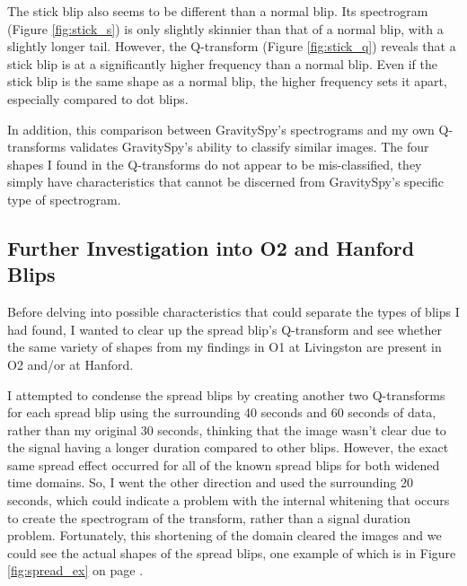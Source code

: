 \documentclass[a4paper]{article}
\begin{document}
The stick blip also seems to be different than a normal blip. Its spectrogram (Figure \ref{fig:stick_s}) is only slightly skinnier than that of a normal blip, with a slightly longer tail. However, the Q-transform (Figure \ref{fig:stick_q}) reveals that a stick blip is at a significantly higher frequency than a normal blip. Even if the stick blip is the same shape as a normal blip, the higher frequency sets it apart, especially compared to dot blips.

In addition, this comparison between GravitySpy's spectrograms and my own Q-transforms validates GravitySpy's ability to classify similar images. The four shapes I found in the Q-transforms do not appear to be mis-classified, they simply have characteristics that cannot be discerned from GravitySpy's specific type of spectrogram.

\subsection{Further Investigation into O2 and Hanford Blips} \label{O2}

Before delving into possible characteristics that could separate the types of blips I had found, I wanted to clear up the spread blip's Q-transform and see whether the same variety of shapes from my findings in O1 at Livingston are present in O2 and/or at Hanford.

I attempted to condense the spread blips by creating another two Q-transforms for each spread blip using the surrounding 40 seconds and 60 seconds of data, rather than my original 30 seconds, thinking that the image wasn't clear due to the signal having a longer duration compared to other blips. However, the exact same spread effect occurred for all of the known spread blips for both widened time domains. So, I went the other direction and used the surrounding 20 seconds, which could indicate a problem with the internal whitening that occurs to create the spectrogram of the transform, rather than a signal duration problem. Fortunately, this shortening of the domain cleared the images and we could see the actual shapes of the spread blips, one example of which is in Figure \ref{fig:spread_ex} on page \pageref{fig:spread_ex}.
\end{document}
